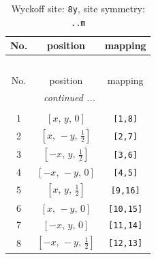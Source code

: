 \documentclass[fleqn,8pt]{jsarticle}
\begin{document}
\begin{longtable}{ccc}
\caption{Wyckoff site: {\tt 8y}, site symmetry: {\tt ..m}}
 \\
 \hline \hline
No. & position & mapping \\ \hline \endfirsthead

\multicolumn{2}{l}{\tablename\ \thetable{}} \\
 \hline \hline
No. & position & mapping \\ \hline \endhead

 \hline \hline
\multicolumn{2}{r}{\footnotesize\it continued ...} \\ \endfoot

 \hline \hline
\multicolumn{2}{r}{} \\ \endlastfoot

1 & $\left[ x,\, y,\, 0 \right]$ & {\tt [1,8]} \\ \hline
2 & $\left[ x,\, - y,\, \frac{1}{2} \right]$ & {\tt [2,7]} \\ \hline
3 & $\left[ - x,\, y,\, \frac{1}{2} \right]$ & {\tt [3,6]} \\ \hline
4 & $\left[ - x,\, - y,\, 0 \right]$ & {\tt [4,5]} \\ \hline
5 & $\left[ x,\, y,\, \frac{1}{2} \right]$ & {\tt [9,16]} \\ \hline
6 & $\left[ x,\, - y,\, 0 \right]$ & {\tt [10,15]} \\ \hline
7 & $\left[ - x,\, y,\, 0 \right]$ & {\tt [11,14]} \\ \hline
8 & $\left[ - x,\, - y,\, \frac{1}{2} \right]$ & {\tt [12,13]} \\
\end{longtable}
\renewcommand{\arraystretch}{1.2}
\end{document}
